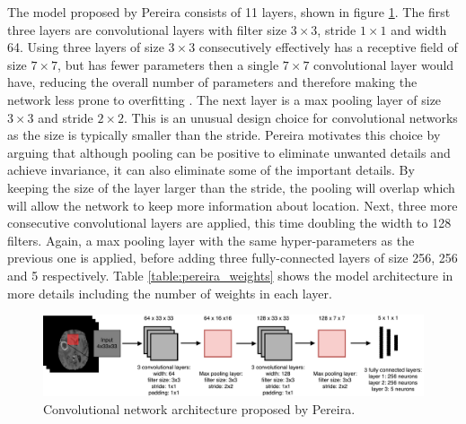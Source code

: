 \documentclass[12pt,a4paper,twoside,openright]{report}
\begin{document}
The model proposed by Pereira \cite{pereira} consists of 11 layers, shown in figure \ref{fig:pereira_model}. The first three layers are convolutional layers with filter size $3 \times 3$, stride $1 \times 1$ and width 64. Using three layers of size $3 \times 3$ consecutively effectively has a receptive field of size $7 \times 7$, but has fewer parameters then a single $7 \times 7$ convolutional layer would have, reducing the overall number of parameters and therefore making the network less prone to overfitting \cite{very_deep_conv_nets}. The next layer is a max pooling layer of size $3 \times 3$ and stride $2 \times 2$. This is an unusual design choice for convolutional networks as the size is typically smaller than the stride. Pereira motivates this choice by arguing that although pooling can be positive to eliminate unwanted details and achieve invariance, it can also eliminate some of the important details. By keeping the size of the layer larger than the stride, the pooling will overlap which will allow the network to keep more information about location. Next, three more consecutive convolutional layers are applied, this time doubling the width to 128 filters. Again, a max pooling layer with the same hyper-parameters as the previous one is applied, before adding three fully-connected layers of size 256, 256 and 5 respectively. Table \ref{table:pereira_weights} shows the model architecture in more details including the number of weights in each layer. 

\begin{figure}
	\centering
	\includegraphics[width=\textwidth]{pereira_model}
	\caption{Convolutional network architecture proposed by Pereira.}
	\label{fig:pereira_model}
\end{figure}
\end{document}
